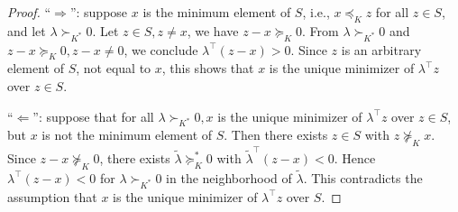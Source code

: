 \documentclass{article}
\begin{document}
\begin{proof}\color{ForestGreen}
``$\Rightarrow$'': suppose $x$ is the minimum element of $S$, i.e., $x \preceq_{K} z$ for all $z \in S$, and let $\lambda \succ_{K^{*}} 0 .$ Let $z \in S, z \neq x$, we have $z-x \succeq_{K} 0 .$ From $\lambda \succ_{K^{*}} 0$ and $z-x \succeq_{K} 0, z-x \neq 0$, we conclude $\lambda^{\top}(z-x)>0$. Since $z$ is an arbitrary element of $S$, not equal to $x$, this shows that $x$ is the unique minimizer of $\lambda^{\top} z$ over $z \in S$. 

``$\Leftarrow$'': suppose that for all $\lambda \succ_{K^{*}} 0, x$ is the unique minimizer of $\lambda^{\top} z$ over $z \in S$, but $x$ is not the minimum element of $S$. Then there exists $z \in S$ with $z \nsucceq_{K} x$. Since $z-x \nsucceq_{K} 0$, there exists $\tilde{\lambda} \succeq_{K}^{*} 0$ with $\tilde{\lambda}^{\top}(z-x)<0 .$ Hence $\lambda^{\top}(z-x)<0$ for $\lambda \succ_{K^{*}} 0$ in the neighborhood of $\tilde{\lambda}$. This contradicts the assumption that $x$ is the unique minimizer of $\lambda^{\top} z$ over $S$.
\end{proof}

\end{document}

